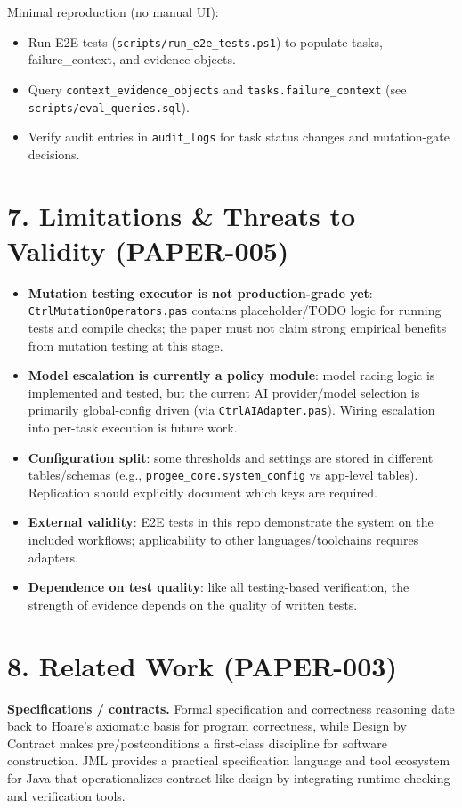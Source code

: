 \documentclass[11pt]{article}
\begin{document}
Minimal reproduction (no manual UI):
\begin{itemize}
\item Run E2E tests (\texttt{scripts/run\_e2e\_tests.ps1}) to populate tasks, failure\_context, and evidence objects.
\item Query \texttt{context\_evidence\_objects} and \texttt{tasks.failure\_context} (see \texttt{scripts/eval\_queries.sql}).
\item Verify audit entries in \texttt{audit\_logs} for task status changes and mutation-gate decisions.
\end{itemize}

\section{7. Limitations \& Threats to Validity (PAPER-005)}
\begin{itemize}
\item \textbf{Mutation testing executor is not production-grade yet}: \texttt{CtrlMutationOperators.pas} contains placeholder/TODO logic for running tests and compile checks; the paper must not claim strong empirical benefits from mutation testing at this stage.
\item \textbf{Model escalation is currently a policy module}: model racing logic is implemented and tested, but the current AI provider/model selection is primarily global-config driven (via \texttt{CtrlAIAdapter.pas}). Wiring escalation into per-task execution is future work.
\item \textbf{Configuration split}: some thresholds and settings are stored in different tables/schemas (e.g., \texttt{progee\_core.system\_config} vs app-level tables). Replication should explicitly document which keys are required.
\item \textbf{External validity}: E2E tests in this repo demonstrate the system on the included workflows; applicability to other languages/toolchains requires adapters.
\item \textbf{Dependence on test quality}: like all testing-based verification, the strength of evidence depends on the quality of written tests.
\end{itemize}

\section{8. Related Work (PAPER-003)}
\textbf{Specifications / contracts.} Formal specification and correctness reasoning date back to Hoare’s axiomatic basis for program correctness, while Design by Contract makes pre/postconditions a first-class discipline for software construction. JML provides a practical specification language and tool ecosystem for Java that operationalizes contract-like design by integrating runtime checking and verification tools.
\end{document}
